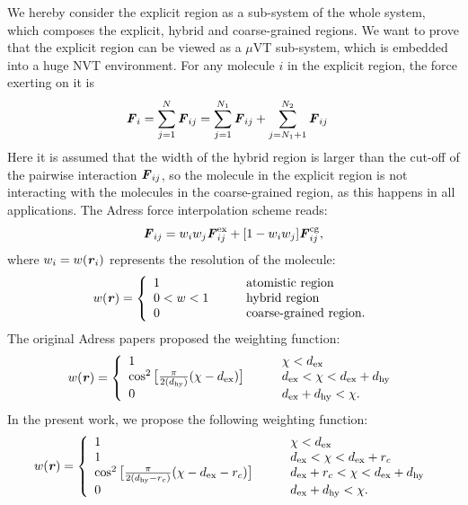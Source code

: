 \documentclass[aps,pre,preprint,unsortedaddress]{revtex4}
\renewcommand{\v}[1]{\textbf{\textit{#1}}}
\begin{document}
We hereby consider the explicit region as a sub-system of the whole
system, which composes the explicit, hybrid and coarse-grained
regions. We want to prove that the explicit region can be viewed as a
$\mu$VT sub-system, which is embedded into a huge NVT environment.
For any molecule $i$ in the explicit region, the force exerting on
it is
\begin{align}
  \v F_i &= \sum_{j=1}^{N}\v F_{ij} 
  =
  \sum_{j=1}^{N_1}\v F_{ij} + \sum_{j=N_1+1}^{N_2}\v F_{ij} 
\end{align}
Here it is assumed that the width of the hybrid region is larger than
the cut-off of the pairwise interaction $\v F_{ij}$, so the molecule
in the explicit region is not interacting with the molecules in the
coarse-grained region, as this happens in all applications.
The Adress force interpolation scheme reads:
\begin{align}\label{eqn:f-interp}
  \v F_{ij} = w_iw_j\v F^{\textrm{ex}}_{ij} + [1-w_iw_j]\v F^{\textrm{cg}}_{ij},
\end{align}
where $w_i = w(\v r_i)$ represents
the resolution of the molecule:
\begin{align}\label{eqn:w1}
  w(\v r) =
  \left\{
    \begin{array}{lcl}
      1 &\quad& \textrm{atomistic region}\\
      0<w<1  && \textrm{hybrid region}\\
      0 && \textrm{coarse-grained region}.
    \end{array}
  \right.
\end{align}
The original Adress papers proposed the weighting function:
\begin{align}\label{eqn:old-w}
  w(\v r) =
  \left\{
    \begin{array}{lcl}
      1 &\quad& \chi < d_{\textrm{ex}}\\
      \cos^2\big[\frac{\pi}{2(d_{\textrm{hy}})} (\chi - d_{\textrm{ex}})\big] && d_{\textrm{ex}}  < \chi < d_{\textrm{ex}} + d_{\textrm{hy}} \\
      0 && d_{\textrm{ex}} + d_{\textrm{hy}}  < \chi.
    \end{array}
  \right.
\end{align}
In the present work, we propose the following weighting function:
\begin{align}\label{eqn:new-w}
  w(\v r) =
  \left\{
    \begin{array}{lcl}
      1 &\quad& \chi < d_{\textrm{ex}}\\
      1  && d_{\textrm{ex}} < \chi < d_{\textrm{ex}} + r_c\\
      \cos^2\big[\frac{\pi}{2(d_{\textrm{hy}} - r_c)} (\chi - d_{\textrm{ex}} - r_c)\big] && d_{\textrm{ex}} + r_c < \chi < d_{\textrm{ex}} + d_{\textrm{hy}} \\
      0 && d_{\textrm{ex}} + d_{\textrm{hy}}  < \chi.
    \end{array}
  \right.
\end{align}
\end{document}
